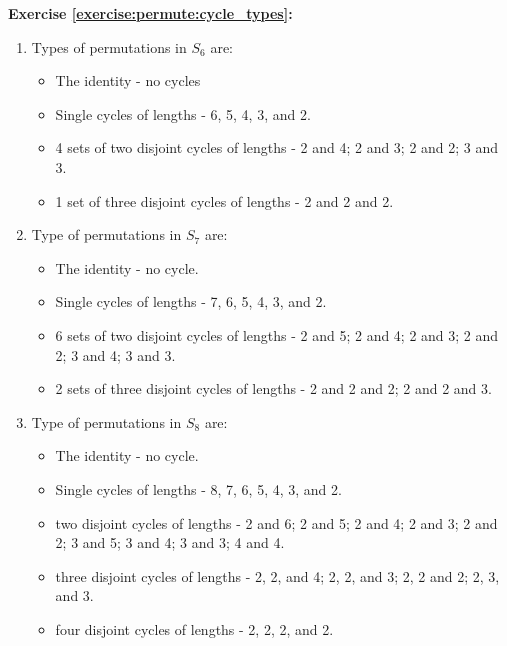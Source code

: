\noindent\textbf{Exercise \ref{exercise:permute:cycle_types}:} %
\begin{enumerate}[{a.}]
\item
Types of permutations in $S_6$ are:
	\begin{itemize}
	\item
	The identity - no cycles
	
	\item
	Single cycles of lengths - 6, 5, 4, 3, and 2.
	
	\item
	4 sets of two disjoint cycles of lengths - 2 and 4; 2 and 3; 2 and 2; 3 and 3.
	
	\item
	1 set of three disjoint cycles of lengths - 2 and 2 and 2.
	\end{itemize}
	
\item
Type of permutations in $S_7$ are:
	\begin{itemize}
	\item
	The identity - no cycle.
	
	\item
	Single cycles of lengths - 7, 6, 5, 4, 3, and 2.
	
	\item
	6 sets of two disjoint cycles of lengths - 2 and 5; 2 and 4; 2 and 3; 2 and 2; 3 and 4; 3 and 3.
	
	\item
	2 sets of three disjoint cycles of lengths - 2 and 2 and 2; 2 and 2 and 3.
	\end{itemize}

\item
Type of permutations in $S_8$ are:
	\begin{itemize}
	\item
	The identity - no cycle.
	
	\item
	Single cycles of lengths - 8, 7, 6, 5, 4, 3, and 2.
	
	\item
	two disjoint cycles of lengths - 2 and 6; 2 and 5; 2 and 4; 2 and 3; 2 and 2; 3 and 5; 3 and 4; 3 and 3; 4 and 4.
	
	\item
	three disjoint cycles of lengths - 2, 2, and 4; 2, 2, and 3; 2, 2 and 2; 2, 3, and 3.
	
	\item
	four disjoint cycles of lengths - 2, 2, 2, and 2.
	\end{itemize}
\end{enumerate}

